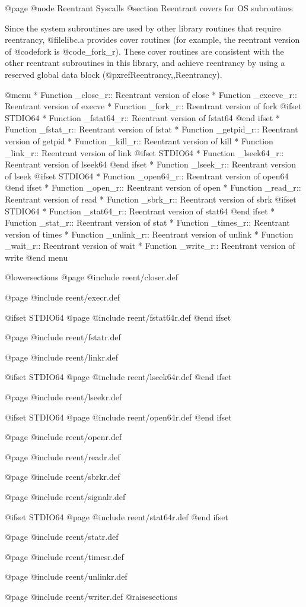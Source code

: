 @page
@node Reentrant Syscalls
@section Reentrant covers for OS subroutines

Since the system subroutines are used by other library routines that
require reentrancy, @file{libc.a} provides cover routines (for example,
the reentrant version of @code{fork} is @code{_fork_r}).  These cover
routines are consistent with the other reentrant subroutines in this
library, and achieve reentrancy by using a reserved global data block
(@pxref{Reentrancy,,Reentrancy}).

@menu
* Function _close_r::	Reentrant version of close
* Function _execve_r::	Reentrant version of execve
* Function _fork_r::	Reentrant version of fork
@ifset STDIO64
* Function _fstat64_r::	Reentrant version of fstat64
@end ifset
* Function _fstat_r::	Reentrant version of fstat
* Function _getpid_r::	Reentrant version of getpid
* Function _kill_r::	Reentrant version of kill
* Function _link_r::	Reentrant version of link
@ifset STDIO64
* Function _lseek64_r::	Reentrant version of lseek64
@end ifset
* Function _lseek_r::	Reentrant version of lseek
@ifset STDIO64
* Function _open64_r::	Reentrant version of open64
@end ifset
* Function _open_r::	Reentrant version of open
* Function _read_r::	Reentrant version of read
* Function _sbrk_r::	Reentrant version of sbrk
@ifset STDIO64
* Function _stat64_r::	Reentrant version of stat64
@end ifset
* Function _stat_r::	Reentrant version of stat
* Function _times_r::	Reentrant version of times
* Function _unlink_r::	Reentrant version of unlink
* Function _wait_r::	Reentrant version of wait
* Function _write_r::	Reentrant version of write
@end menu

@lowersections
@page
@include reent/closer.def

@page
@include reent/execr.def

@ifset STDIO64
@page
@include reent/fstat64r.def
@end ifset

@page
@include reent/fstatr.def

@page
@include reent/linkr.def

@ifset STDIO64
@page
@include reent/lseek64r.def
@end ifset

@page
@include reent/lseekr.def

@ifset STDIO64
@page
@include reent/open64r.def
@end ifset

@page
@include reent/openr.def

@page
@include reent/readr.def

@page
@include reent/sbrkr.def

@page
@include reent/signalr.def

@ifset STDIO64
@page
@include reent/stat64r.def
@end ifset

@page
@include reent/statr.def

@page
@include reent/timesr.def

@page
@include reent/unlinkr.def

@page
@include reent/writer.def
@raisesections
